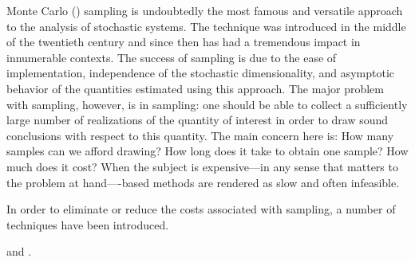 Monte Carlo () sampling \cite{xiu2010} is undoubtedly the most famous
and versatile approach to the analysis of stochastic systems. The technique was
introduced in the middle of the twentieth century and since then has had a
tremendous impact in innumerable contexts. The success of  sampling is
due to the ease of implementation, independence of the stochastic
dimensionality, and asymptotic behavior of the quantities estimated using this
approach. The major problem with  sampling, however, is in sampling:
one should be able to collect a sufficiently large number of realizations of the
quantity of interest in order to draw sound conclusions with respect to this
quantity. The main concern here is: How many samples can we afford drawing? How
long does it take to obtain one sample? How much does it cost? When the subject
is expensive---in any sense that matters to the problem at
hand----based methods are rendered as slow and often infeasible.

In order to eliminate or reduce the costs associated with  sampling, a
number of techniques have been introduced.

\cite{ukhov2014} and \cite{ukhov2015}.
